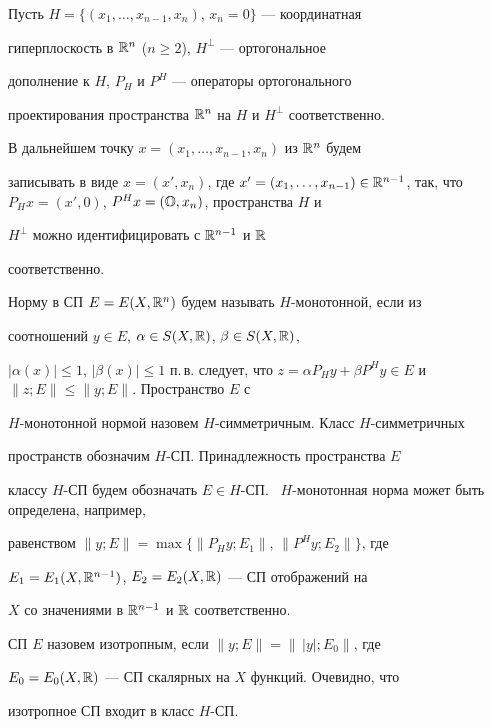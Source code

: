  


Пусть $H=\{(x_1,\dotsc,x_{n-1},x_n)$, $x_n=0\}$ --- координатная 


гиперплоскость в $\Bbb R^n$ ($n\ge2$), $H^\bot$ --- ортогональное 


дополнение к $H$, $P_H$ и $P^H$ --- операторы ортогонального 


проектирования пространства $\Bbb R^n$ на $H$ и $H^\bot$ соответственно. 


В дальнейшем точку $x=(x_1,\dotsc,x_{n-1},x_n)$ из $\Bbb R^n$ будем 


записывать в виде $x=(x',x_n)$, где $x'=(x_1,\dotsc,x_{n-1})\in\Bbb 


R^{n-1}$, так, что $P_H x=(x',0)$, $P^H x=(\Bbb O,x_n)$, пространства $H$ и 


$H^\bot$ можно идентифицировать с $\Bbb R^{n-1}$ и $\Bbb R$ 


соответственно. 


 


Норму в СП $E=E(X,\Bbb R^n)$ будем называть $H$-монотонной, если из 


соотношений $y\in E$, $\alpha\in S(X,\Bbb R)$, $\beta\in S(X,\Bbb R)$, 


$|\alpha(x)|\le1$, $|\beta(x)|\le1$ п.\,в. следует, что $z=\alpha P_H 


y+\beta P^H y\in E$ и $\|z;E\|\le\|y;E\|$. Пространство $E$ с 


$H$-монотонной нормой назовем $H$-симметричным. Класс $H$-симметричных


пространств обозначим $H$-СП. Принадлежность пространства $E$


классу $H$-СП будем обозначать $E\in 


H$-СП. \ $H$-монотонная норма может быть определена, например, 


равенством $\|y;E\|=\max\{\|P_H y;E_1\|$, $\|P^H y;E_2\|\}$, где 


$E_1=E_1(X,\Bbb R^{n-1})$, $E_2=E_2(X,\Bbb R)$ --- СП отображений на 


$X$ со значениями в $\Bbb R^{n-1}$ и $\Bbb R$ соответственно. 


 


СП $E$ назовем изотропным, если $\|y;E\|=\|\,|y|;E_0\|$, где 


$E_0=E_0(X,\Bbb R)$ --- СП скалярных на $X$ функций. Очевидно, что 


изотропное СП входит в класс $H$-СП. 



